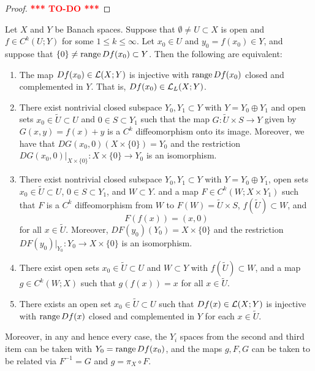 \documentclass[a4paper]{article}
\newcommand{\TODO}{\textcolor{red}{\textbf{*** TO-DO ***}}}
\begin{document}
\begin{proof}
\TODO
\end{proof}

\begin{thm}
Let $X$ and $Y$ be Banach spaces. Suppose that $\emptyset \neq U
\subset X$ is open and $f \in C^k(U; Y)$ for some $1 \leq k \leq
\infty$. Let $x_0 \in U$ and $y_0 = f(x_0) \in Y$, and suppose
that $\{0\} \neq \operatorname{range} Df(x_0) \subset Y$. Then the
following are equivalent:
\begin{enumerate}
\item The map $Df(x_0) \in \mathcal{L}(X; Y)$ is injective with $\operatorname{range}
Df(x_0)$ closed and complemented in $Y$. That is, $Df(x_0)
\in \mathcal{L}_L(X; Y)$.

\item There exist nontrivial closed subspace $Y_0, Y_1
\subset Y$ with $Y = Y_0 \oplus Y_1$ and open sets $x_0
\in \tilde{U} \subset U$ and $0 \in S \subset Y_1$ such that
the map $G : \tilde{U} \times S \to Y$ given by $G(x, y)
= f(x) + y$ is a $C^k$ diffeomorphism onto its image.
Moreover, we have that $DG(x_0, 0) (X \times \{0\}) = Y_0$
and the restriction $DG(x_0, 0) \vert_{X \times \{0\}}
: X \times \{0\} \to Y_0$ is an isomorphism.

\item There exist nontrivial closed subspace $Y_0, Y_1
\subset Y$ with $Y = Y_0 \oplus Y_1$, open sets $x_0 \in \tilde{U}
\subset U$, $0 \in S \subset Y_1$, and $W \subset Y$.
and a map $F \in C^k(W ; X \times Y_1)$ such that $F$
is a $C^k$ diffeomorphism from $W$ to $F(W) = \tilde{U}
\times S$, $f(\tilde{U}) \subset W$, and
\[
F(f(x)) = (x, 0)
\]
for all $x \in \tilde{U}$. Moreover, $DF(y_0) (Y_0) = X \times
\{0\}$ and the restriction $DF(y_0) \vert_{Y_0} : Y_0
\to X \times \{0\}$ is an isomorphism.

\item There exist open sets $x_0 \in \tilde{U} \subset U$
and $W \subset Y$ with $f(\tilde{U}) \subset W$, and a map
$g \in C^k(W ; X)$ such that $g(f(x)) = x$ for all $x \in
\tilde{U}$.

\item There exists an open set $x_0 \in \tilde{U} \subset U$
such that $Df(x) \in \mathcal{L}(X; Y)$ is injective with
$\operatorname{range} Df(x)$ closed and complemented in $Y$ for each
$x \in \tilde{U}$.
\end{enumerate}

Moreover, in any and hence every case, the $Y_i$ spaces
from the second and third item can be taken with $Y_0
= \operatorname{range} Df(x_0)$, and the maps $g, F, G$ can be taken to be related
via $F^{-1} = G$ and $g = \pi_X \circ F$.
\end{thm}
\end{document}

